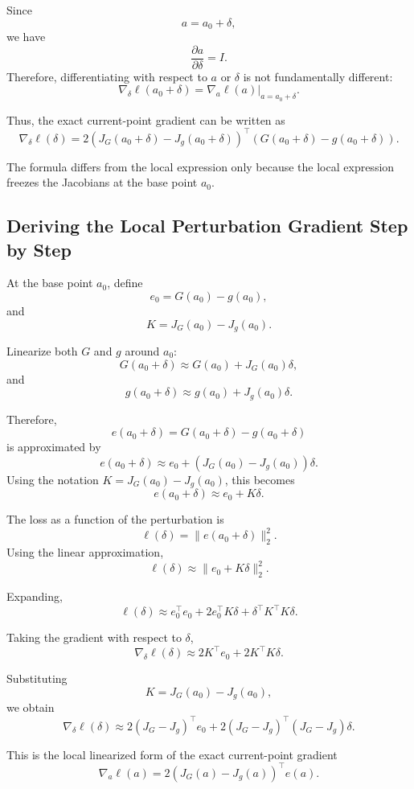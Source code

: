 \documentclass{article}
\begin{document}
Since
\[
    a=a_0+\delta,
\]
we have
\[
    \frac{\partial a}{\partial \delta}=I.
\]
Therefore, differentiating with respect to \(a\) or \(\delta\) is not fundamentally different:
\[
    \nabla_\delta \ell(a_0+\delta)
    =
    \nabla_a \ell(a)\big|_{a=a_0+\delta}.
\]

Thus, the exact current-point gradient can be written as
\[
    \nabla_\delta \ell(\delta)
    =
    2\left(J_G(a_0+\delta)-J_g(a_0+\delta)\right)^\top
    \left(G(a_0+\delta)-g(a_0+\delta)\right).
\]

The formula differs from the local expression only because the local expression freezes the Jacobians at the base point \(a_0\).

\subsection{Deriving the Local Perturbation Gradient Step by Step}

At the base point \(a_0\), define
\[
    e_0=G(a_0)-g(a_0),
\]
and
\[
    K=J_G(a_0)-J_g(a_0).
\]

Linearize both \(G\) and \(g\) around \(a_0\):
\[
    G(a_0+\delta)
    \approx
    G(a_0)+J_G(a_0)\delta,
\]
and
\[
    g(a_0+\delta)
    \approx
    g(a_0)+J_g(a_0)\delta.
\]

Therefore,
\[
    e(a_0+\delta)
    =
    G(a_0+\delta)-g(a_0+\delta)
\]
is approximated by
\[
    e(a_0+\delta)
    \approx
    e_0+
    \left(J_G(a_0)-J_g(a_0)\right)\delta.
\]
Using the notation \(K=J_G(a_0)-J_g(a_0)\), this becomes
\[
    e(a_0+\delta)
    \approx
    e_0+K\delta.
\]

The loss as a function of the perturbation is
\[
    \ell(\delta)
    =
    \|e(a_0+\delta)\|_2^2.
\]
Using the linear approximation,
\[
    \ell(\delta)
    \approx
    \|e_0+K\delta\|_2^2.
\]

Expanding,
\[
    \ell(\delta)
    \approx
    e_0^\top e_0
    +
    2e_0^\top K\delta
    +
    \delta^\top K^\top K\delta.
\]

Taking the gradient with respect to \(\delta\),
\[
    \nabla_\delta \ell(\delta)
    \approx
    2K^\top e_0
    +
    2K^\top K\delta.
\]

Substituting
\[
    K=J_G(a_0)-J_g(a_0),
\]
we obtain
\[
    \boxed{
    \nabla_\delta \ell(\delta)
    \approx
    2\left(J_G-J_g\right)^\top e_0
    +
    2\left(J_G-J_g\right)^\top
    \left(J_G-J_g\right)\delta
    }.
\]

This is the local linearized form of the exact current-point gradient
\[
    \nabla_a \ell(a)
    =
    2\left(J_G(a)-J_g(a)\right)^\top e(a).
\]
\end{document}
